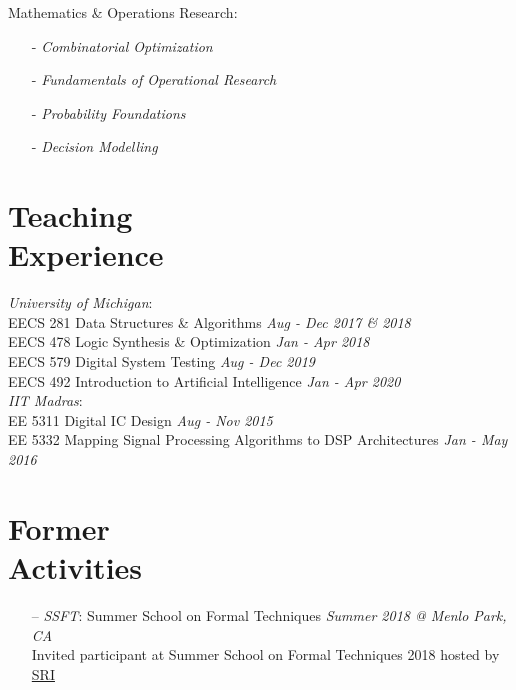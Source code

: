 \documentclass[margin,line,letter]{resume}
\begin{document}
\begin{resume}
        \vspace{-0.6cm}
        \phantom{xx}\hspace{0ex} Mathematics \& Operations Research:
        \vspace{-0.3cm}
        \begin{multicols}{2}
        \begin{itemize}
        \item[-] \emph{Combinatorial Optimization}
        \item[-] \emph{Fundamentals of Operational Research}
        \item[-] \emph{Probability Foundations}
        \item[-] \emph{Decision Modelling}
        \end{itemize}
        \end{multicols}

\section{\mysidestyle Teaching\\Experience}
    \textit{University of Michigan}: \\
    \phantom{xx}\hspace{3ex} EECS 281 Data Structures \& Algorithms \hfill \emph{Aug - Dec 2017 \& 2018} \\
    \phantom{xx}\hspace{3ex} EECS 478 Logic Synthesis \& Optimization \hfill \emph{Jan - Apr 2018} \\
    \phantom{xx}\hspace{3ex} EECS 579 Digital System Testing \hfill \emph{Aug - Dec 2019} \\
    \phantom{xx}\hspace{3ex} EECS 492 Introduction to Artificial Intelligence \hfill \emph{Jan - Apr 2020} \\
    \textit{IIT Madras}: \\
    \phantom{xx}\hspace{3ex} EE 5311 Digital IC Design \hfill \emph{Aug - Nov 2015} \\
    \phantom{xx}\hspace{3ex} EE 5332 Mapping Signal Processing Algorithms to DSP Architectures \hfill \emph{Jan - May 2016}

\section{\mysidestyle Former \\ Activities}
    \noindent
    \begin{itemize}[leftmargin=*]
    \item[--] \textit{SSFT}: Summer School on Formal Techniques \hfill \emph{Summer 2018 @ Menlo Park, CA} \\
    Invited participant at Summer School on Formal Techniques 2018 hosted by \href{http://csl.sri.com/}{SRI}
    

\end{itemize}
\end{resume}
\end{document}
